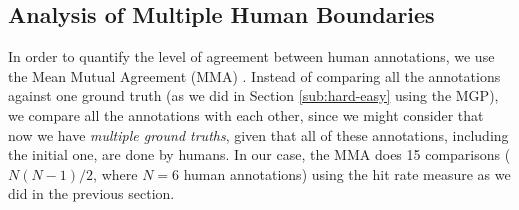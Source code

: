 \documentclass{article}
\begin{document}







\subsection{Analysis of Multiple Human Boundaries}

In order to quantify the level of agreement between human annotations, we use the Mean Mutual Agreement (MMA) \cite{Holzapfel2012}.
Instead of comparing all the annotations against one ground truth (as we did in Section \ref{sub:hard-easy} using the MGP), we compare all the annotations with each other, since we might consider that now we have \textit{multiple ground truths}, given that all of these annotations, including the initial one, are done by humans.
In our case, the MMA does 15 comparisons ($N(N-1)/2$, where $N=6$ human annotations) using the hit rate measure as we did in the previous section.
\end{document}
